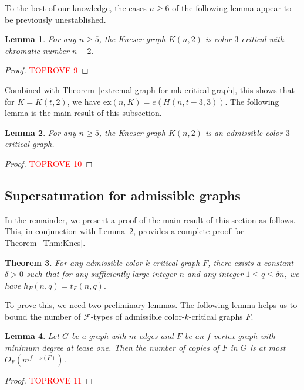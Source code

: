 \documentclass[10pt]{article}
\newtheorem{theorem}{Theorem}[section]
\newtheorem{lemma}[theorem]{Lemma}
\def\ex{\mathrm{ex}}
\begin{document}
To the best of our knowledge, the cases $n\geq 6$ of the following lemma appear to be previously unestablished.

\begin{lemma}\label{Lem:K(n,2)}
For any $n\geq 5$, the Kneser graph $K(n,2)$ is color-$3$-critical with chromatic number $n-2$.
\end{lemma}

\begin{proof}\textcolor{red}{TOPROVE 9}\end{proof}

Combined with Theorem~\ref{extremal graph for mk-critical graph},
this shows that for $K=K(t,2)$, we have $\ex(n,K)=e(H(n,t-3,3)).$
The following lemma is the main result of this subsection.

\begin{lemma}\label{Lem2:K(n,2)}
For any $n\geq 5$, the Kneser graph $K(n,2)$ is an admissible color-$3$-critical graph.
\end{lemma}

\begin{proof}\textcolor{red}{TOPROVE 10}\end{proof}

\subsection{Supersaturation for admissible graphs}
In the remainder, we present a proof of the main result of this section as follows.
This, in conjunction with Lemma~\ref{Lem2:K(n,2)}, provides a complete proof for Theorem~\ref{Thm:Knes}.

\begin{theorem}\label{Thm:adm}
For any admissible color-$k$-critical graph $F$, there exists a constant $\delta>0$ such that for any sufficiently large integer $n$ and any integer $1\leq q\leq \delta n$, we have
$h_F(n,q)=t_F(n,q).$
\end{theorem}

To prove this, we need two preliminary lemmas.
The following lemma helps us to bound the number of $\mathcal{F}$-types of admissible color-$k$-critical graphs $F$.

\begin{lemma}\label{bounded the numer of graph with given size}
Let $G$ be a graph with $m$ edges and $F$ be an $f$-vertex graph with minimum degree at lease one.
Then the number of copies of $F$ in $G$ is at most $O_F (m^{f-\nu(F)})$.
\end{lemma}
\begin{proof}\textcolor{red}{TOPROVE 11}\end{proof}
\end{document}
